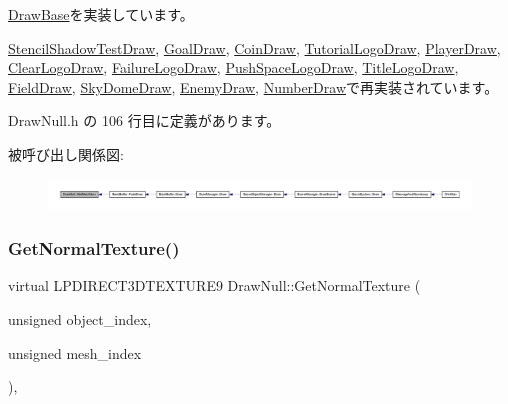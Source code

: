 \mbox{\hyperlink{class_draw_base_a194eb48924f205d60d4e63c5becdd2fe}{Draw\+Base}}を実装しています。



\mbox{\hyperlink{class_stencil_shadow_test_draw_acfa569f1dcdc3829796138e313f204ad}{Stencil\+Shadow\+Test\+Draw}}, \mbox{\hyperlink{class_goal_draw_a7f30c7a4325668eebd8730ad2bea1ad8}{Goal\+Draw}}, \mbox{\hyperlink{class_coin_draw_a178c8d88effe55aaad7d0e45b02e0566}{Coin\+Draw}}, \mbox{\hyperlink{class_tutorial_logo_draw_a19de254c5460e3728d7c79243fd65e6f}{Tutorial\+Logo\+Draw}}, \mbox{\hyperlink{class_player_draw_ad9e2e09a32c7474fcea5e7e24e22bc71}{Player\+Draw}}, \mbox{\hyperlink{class_clear_logo_draw_a99aba47b4693f15498daf7df2bfee2d7}{Clear\+Logo\+Draw}}, \mbox{\hyperlink{class_failure_logo_draw_aa7164b6f5788416788482893aa747d59}{Failure\+Logo\+Draw}}, \mbox{\hyperlink{class_push_space_logo_draw_a9a40fca53e23b9970a7c5decaa3d2da6}{Push\+Space\+Logo\+Draw}}, \mbox{\hyperlink{class_title_logo_draw_a14212f1ee003c40d63db3822a84af7fb}{Title\+Logo\+Draw}}, \mbox{\hyperlink{class_field_draw_aeb54d8cba559ef615ee46c8a7bbd3b9f}{Field\+Draw}}, \mbox{\hyperlink{class_sky_dome_draw_a7ecd8d4b987e4d58a247d3438a45f9d4}{Sky\+Dome\+Draw}}, \mbox{\hyperlink{class_enemy_draw_acda1a2487aea432b08fc816351a12239}{Enemy\+Draw}}, \mbox{\hyperlink{class_number_draw_a8234fb06d885feaa8a2f0ecf256db9a0}{Number\+Draw}}で再実装されています。



 Draw\+Null.\+h の 106 行目に定義があります。

被呼び出し関係図\+:
\nopagebreak
\begin{figure}[H]
\begin{center}
\leavevmode
\includegraphics[width=350pt]{class_draw_null_ad735978a85a5f3583eecd82d6bfe6413_icgraph}
\end{center}
\end{figure}
\mbox{\label{class_draw_null_a41b7d148612b2d328e85289e32dc374c}} 
\subsubsection{\texorpdfstring{Get\+Normal\+Texture()}{GetNormalTexture()}}
{\footnotesize\ttfamily virtual L\+P\+D\+I\+R\+E\+C\+T3\+D\+T\+E\+X\+T\+U\+R\+E9 Draw\+Null\+::\+Get\+Normal\+Texture (\begin{DoxyParamCaption}\item[{unsigned}]{object\+\_\+index,  }\item[{unsigned}]{mesh\+\_\+index }\end{DoxyParamCaption})\hspace{0.3cm}{\ttfamily [inline]}, {\ttfamily [virtual]}}




